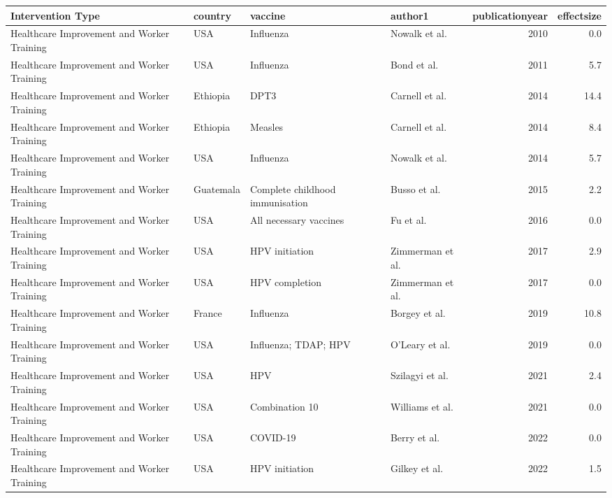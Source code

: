 
\begin{tabular}{llllrr}
\toprule
Intervention Type & country & vaccine & author1 & publicationyear & effectsize\\
\midrule
Healthcare Improvement and Worker Training & USA & Influenza & Nowalk et al. & 2010 & 0.0\\
Healthcare Improvement and Worker Training & USA & Influenza & Bond et al. & 2011 & 5.7\\
Healthcare Improvement and Worker Training & Ethiopia & DPT3 & Carnell et al. & 2014 & 14.4\\
Healthcare Improvement and Worker Training & Ethiopia & Measles & Carnell et al. & 2014 & 8.4\\
Healthcare Improvement and Worker Training & USA & Influenza & Nowalk et al. & 2014 & 5.7\\
\addlinespace
Healthcare Improvement and Worker Training & Guatemala & Complete childhood immunisation & Busso et al. & 2015 & 2.2\\
Healthcare Improvement and Worker Training & USA & All necessary vaccines & Fu et al. & 2016 & 0.0\\
Healthcare Improvement and Worker Training & USA & HPV initiation & Zimmerman et al. & 2017 & 2.9\\
Healthcare Improvement and Worker Training & USA & HPV completion & Zimmerman et al. & 2017 & 0.0\\
Healthcare Improvement and Worker Training & France & Influenza & Borgey et al. & 2019 & 10.8\\
\addlinespace
Healthcare Improvement and Worker Training & USA & Influenza; TDAP; HPV & O'Leary et al. & 2019 & 0.0\\
Healthcare Improvement and Worker Training & USA & HPV & Szilagyi et al. & 2021 & 2.4\\
Healthcare Improvement and Worker Training & USA & Combination 10 & Williams et al. & 2021 & 0.0\\
Healthcare Improvement and Worker Training & USA & COVID-19 & Berry et al. & 2022 & 0.0\\
Healthcare Improvement and Worker Training & USA & HPV initiation & Gilkey et al. & 2022 & 1.5\\
\bottomrule
\end{tabular}
